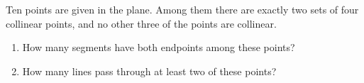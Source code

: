Ten points are given in the plane. Among them there are exactly two sets of four collinear points, and no other three of the points are collinear.
\begin{enumerate}
\item[(a)] How many segments have both endpoints among these points?
\item[(b)] How many lines pass through at least two of these points?
\end{enumerate}
